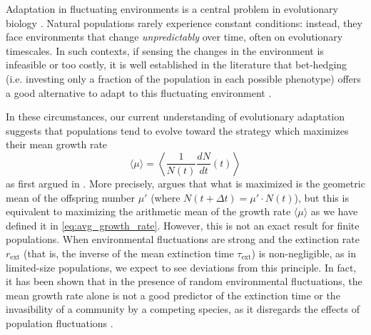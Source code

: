 \documentclass[aps,pre,reprint,10pt,superscriptaddress]{revtex4-2}
\begin{document}
Adaptation in fluctuating environments is a central problem in evolutionary biology \cite{gillespieNaturalSelectionVariances1977,kingscollegeRiskUncertaintyEvolutionary1982,kussellPhenotypicDiversityPopulation2005,ashcroftFixationFinitePopulations2014,patraEmergencePhenotypeSwitching2015,huftonIntrinsicNoiseSystems2016,wienandEvolutionFluctuatingPopulation2017,saakianAlleleFixationProbability2019,taitelbaumPopulationDynamicsChanging2020,camachomateuPhenotypicdependentVariabilityEmergence2021,kaushikTimeFixationChanging2021,collectiveEconomicPrinciplesCell,nakashimaPopulationDynamicsModels2023}. Natural populations rarely experience constant conditions: instead, they face environments that change \emph{unpredictably} over time, often on evolutionary timescales. In such contexts, if sensing the changes in the environment is infeasible or too costly, it is well established in the literature that bet-hedging (i.e. investing only a fraction of the population in each possible phenotype) offers a good alternative to adapt to this fluctuating environment \cite{kussellPhenotypicDiversityPopulation2005,patraEmergencePhenotypeSwitching2015,huftonPhenotypicSwitchingPopulations2018,camachomateuPhenotypicdependentVariabilityEmergence2021,collectiveEconomicPrinciplesCell,nakashimaPopulationDynamicsModels2023}.

In these circumstances, our current understanding of evolutionary adaptation suggests that populations tend to evolve toward the strategy which maximizes their mean growth rate
\begin{equation} \label{eq:avg_growth_rate}
    \langle\mu\rangle=\left\langle\frac{1}{N(t)}\frac{dN}{dt}(t)\right\rangle
\end{equation}
as first argued in \cite{gillespieNaturalSelectionVariances1977}. More precisely, \cite{gillespieNaturalSelectionVariances1977} argues that what is maximized is the geometric mean of the offspring number $\mu'$ (where $N(t+\Delta t)=\mu'\cdot N(t)$), but this is equivalent to maximizing the arithmetic mean of the growth rate $\langle\mu\rangle$ as we have defined it in \cref{eq:avg_growth_rate}. However, this is not an exact result for finite populations. When environmental fluctuations are strong and the extinction rate $r_\text{ext}$ (that is, the inverse of the mean extinction time $\tau_\text{ext}$) is non-negligible, as in limited-size populations, we expect to see deviations from this principle. In fact, it has been shown that in the presence of random environmental fluctuations, the mean growth rate alone is not a good predictor of the extinction time or the invasibility of a community by a competing species, as it disregards the effects of population fluctuations \cite{pandeMeanGrowthRate2020,pandeQuantifyingInvasibility2022,davila-romeroExtinctionAgentbasedCollective2026}.
\end{document}
